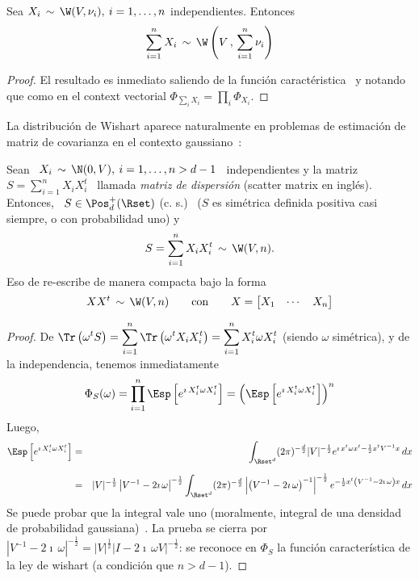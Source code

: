 \begin{lema}
\label{Lem:MP:StabilidadWishartSuma}
%
  Sea $X_i \,  \sim \, \W(V,\nu_i), \: i = 1,\ldots,n$ independientes. Entonces
  \[
  \sum_{i=1}^n X_i \, \sim \, \W\left( V \, , \, \sum_{i=1}^n \nu_i \right)
  \]
\end{lema}
%
\begin{proof}
  El     resultado     es     inmediato     saliendo     de     la     funci\'on
  caract\'eristica~ y notando que como en
  el context vectorial $\Phi_{\sum_i X_i} = \prod_i \Phi_{X_i}$.
\end{proof}

La distribuci\'on  de Wishart aparece naturalmente en  problemas de estimaci\'on
de matriz de covarianza en el contexto gaussiano~\cite{Mui82, BilBre99, GupNag99,
  And03, Seb04, KotNad04}:
%
\begin{lema}\label{Lem:MP:WishartGaussiana}
%
  Sean \ $X_i \, \sim \, \N(0,V), \: i = 1, \ldots , n > d-1$ \ independientes y
  la  matriz  \  $S  =  \sum_{i=1}^n   X_i  X_i^t$  \  llamada  {\em  matriz  de
    dispersi\'on} (scatter matrix en ingl\'es). Entonces, \ $S \in \Pos_d^+(\Rset)$
  (c.   s.)   \  ($S$ es  sim\'etrica  definida  positiva  casi siempre,  o  con
  probabilidad uno) y \
  \[
  S = \sum_{i=1}^n X_i X_i^t \,\sim \, \W(V,n).
  \]
  Eso de re-escribe de manera compacta bajo la forma
  \[
  X X^t  \,\sim \, \W(V,n)  \qquad \mbox{con} \qquad  X = \begin{bmatrix}  X_1 &
    \cdots & X_n \end{bmatrix}
  \]
\end{lema}
%
\begin{proof}
  De  $\displaystyle  \Tr\left(  \omega^t  S \right)  =  \sum_{i=1}^n  \Tr\left(
    \omega^t  X_i  X_i^t \right)  =  \sum_{i=1}^n  X_i^t  \omega X_i^t$  (siendo
  $\omega$ sim\'etrica), y de la independencia, tenemos inmediatamente
%
\[
\Phi_S(\omega)  =  \prod_{i=1}^n \Esp\left[  e^{\imath  \,  X_i^t \omega  X_i^t}
\right] = \left( \Esp\left[ e^{\imath \, X_i^t \omega X_i^t} \right] \right)^n
\]
%
Luego,
%
\begin{eqnarray*}
\Esp\left[ e^{\imath \, X_i^t \omega X_i^t} \right] & = & \int_{\Rset^d} (2
\pi)^{-\frac{d}{2}} |V|^{-\frac12} e^{\imath \, x^t \omega x^t - \frac12 x^t
V^{-1} x} \, dx\\[2mm]
%
& = & |V|^{-\frac12} \left| V^{-1} - 2 \imath \, \omega \right|^{-\frac12}
\int_{\Rset^d} (2 \pi)^{-\frac{d}{2}} \left| \left(V^{-1} - 2 \imath \,
\omega\right)^{-1} \right|^{-\frac12} e^{- \frac12 x^t \left(V^{-1} - 2 \imath
\, \omega \right) x} \, dx
\end{eqnarray*}
%
Se puede probar  que la integral vale uno (moralmente,  integral de una densidad
de  probabilidad gaussiana)~\cite[Teo.~2.1.11]{Mui82}.  La  prueba se  cierra por
$\left| V^{-1} - 2 \imath  \, \omega \right|^{-\frac12} = |V|^{\frac12} \left| I
  -  2  \imath \,  \omega  V \right|^{-\frac12}$:  se  reconoce  en $\Phi_S$  la
funci\'on caracter\'istica de la ley de wishart (a condici\'on que $n > d-1$).
\end{proof}
